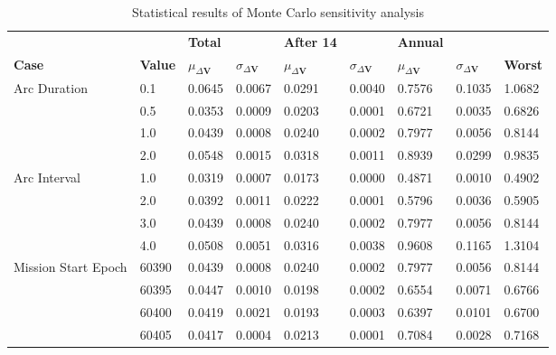 \begin{table}[h!]
\centering
\begin{tabular}{lllllllll}
 &  & \cellcolor[HTML]{EFEFEF}\textbf{Total} &  & \cellcolor[HTML]{EFEFEF}\textbf{After 14} & & \cellcolor[HTML]{EFEFEF}\textbf{Annual} & &\\
\rowcolor[HTML]{EFEFEF} 
\textbf{Case} & \textbf{Value} & \textbf{$\mu_{\Delta \boldsymbol{V}}$} & \textbf{$\sigma_{\Delta \boldsymbol{V}}$} & \textbf{$\mu_{\Delta \boldsymbol{V}}$} & \textbf{$\sigma_{\Delta \boldsymbol{V}}$} & \textbf{$\mu_{\Delta \boldsymbol{V}}$} & \textbf{$\sigma_{\Delta \boldsymbol{V}}$} & \textbf{Worst} \\ 
Arc Duration & 0.1 & 0.0645 & 0.0067 & 0.0291 & 0.0040 & 0.7576 & 0.1035 & 1.0682 \\ 
 & 0.5 & 0.0353 & 0.0009 & 0.0203 & 0.0001 & 0.6721 & 0.0035 & 0.6826 \\ 
 & 1.0 & 0.0439 & 0.0008 & 0.0240 & 0.0002 & 0.7977 & 0.0056 & 0.8144 \\ 
 & 2.0 & 0.0548 & 0.0015 & 0.0318 & 0.0011 & 0.8939 & 0.0299 & 0.9835 \\ 
Arc Interval & 1.0 & 0.0319 & 0.0007 & 0.0173 & 0.0000 & 0.4871 & 0.0010 & 0.4902 \\ 
 & 2.0 & 0.0392 & 0.0011 & 0.0222 & 0.0001 & 0.5796 & 0.0036 & 0.5905 \\ 
 & 3.0 & 0.0439 & 0.0008 & 0.0240 & 0.0002 & 0.7977 & 0.0056 & 0.8144 \\ 
 & 4.0 & 0.0508 & 0.0051 & 0.0316 & 0.0038 & 0.9608 & 0.1165 & 1.3104 \\ 
Mission Start Epoch & 60390 & 0.0439 & 0.0008 & 0.0240 & 0.0002 & 0.7977 & 0.0056 & 0.8144 \\ 
 & 60395 & 0.0447 & 0.0010 & 0.0198 & 0.0002 & 0.6554 & 0.0071 & 0.6766 \\ 
 & 60400 & 0.0419 & 0.0021 & 0.0193 & 0.0003 & 0.6397 & 0.0101 & 0.6700 \\ 
 & 60405 & 0.0417 & 0.0004 & 0.0213 & 0.0001 & 0.7084 & 0.0028 & 0.7168 \\ 
\end{tabular}
\caption{Statistical results of Monte Carlo sensitivity analysis}
\label{tab:SensitivityAnalysis}
\end{table}